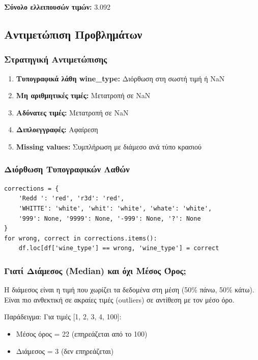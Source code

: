 \documentclass[12pt,a4paper]{article}
\begin{document}
\textbf{Σύνολο ελλειπουσών τιμών:} 3.092

\subsection{Αντιμετώπιση Προβλημάτων}

\subsubsection{Στρατηγική Αντιμετώπισης}

\begin{enumerate}
    \item \textbf{Τυπογραφικά λάθη wine\_type:} Διόρθωση στη σωστή τιμή ή NaN
    \item \textbf{Μη αριθμητικές τιμές:} Μετατροπή σε NaN
    \item \textbf{Αδύνατες τιμές:} Μετατροπή σε NaN
    \item \textbf{Διπλοεγγραφές:} Αφαίρεση
    \item \textbf{Missing values:} Συμπλήρωση με διάμεσο ανά τύπο κρασιού
\end{enumerate}

\subsubsection{Διόρθωση Τυπογραφικών Λαθών}

\begin{lstlisting}
corrections = {
    'Redd ': 'red', 'r3d': 'red',
    'WHITTE': 'white', 'whit': 'white', 'whate': 'white',
    '999': None, '9999': None, '-999': None, '?': None
}
for wrong, correct in corrections.items():
    df.loc[df['wine_type'] == wrong, 'wine_type'] = correct
\end{lstlisting}

\subsubsection{Γιατί Διάμεσος (Median) και όχι Μέσος Όρος;}

Η διάμεσος είναι η τιμή που χωρίζει τα δεδομένα στη μέση (50\% πάνω, 50\% κάτω). Είναι πιο ανθεκτική σε ακραίες τιμές (outliers) σε αντίθεση με τον μέσο όρο.

Παράδειγμα: Για τιμές [1, 2, 3, 4, 100]:
\begin{itemize}
    \item Μέσος όρος = 22 (επηρεάζεται από το 100)
    \item Διάμεσος = 3 (δεν επηρεάζεται)
\end{itemize}
\end{document}
